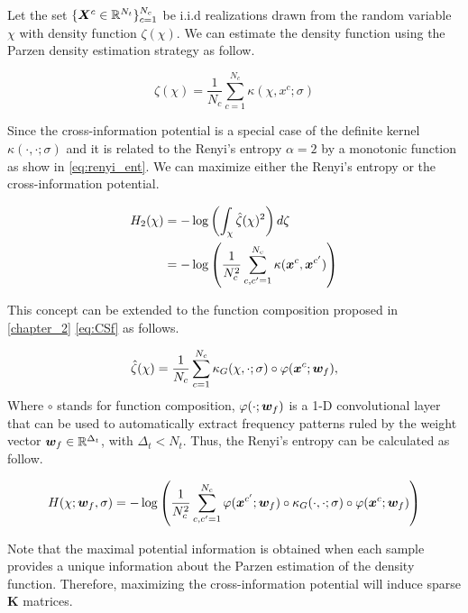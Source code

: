 Let the set $\{\bm {X}^c \in \mathbb{R}^{N_t} \}_{c=1}^{N_c}$ be i.i.d realizations drawn from the random variable $\chi$ with density function $\zeta(\chi)$. We can estimate the density function using the Parzen density estimation strategy as follow.

\begin{equation}
    \hat{\zeta}(\chi) = \frac{1}{N_c} \sum_{c=1}^{N_c} \kappa(\chi,x^c ; \sigma)
\end{equation}

Since the cross-information potential is a special case of the definite kernel $\kappa(\cdot,\cdot ; \sigma)$ and it is related to the Renyi's entropy $\alpha=2$ by a monotonic function as show in \cref{eq:renyi_ent}. We can maximize either the Renyi's entropy or the cross-information potential.

\begin{equation}\label{eq:renyi_ent}
\begin{aligned}
    H_2(\chi) &= - \log \left( \int_{\chi} \hat{\zeta}(\chi)^2 \right) d\zeta \\
              &= - \log \left( \frac{1}{N_{c}^{2}} \sum_{c,c'=1}^{N_c} \kappa ( \bm {x}^{c} , \bm {x}^{c'} ) \right)
\end{aligned}
\end{equation}

This concept can be extended to the function composition proposed in \cref{chapter_2} \cref{eq:CSf} as follows.

\begin{equation}
    \hat{\zeta}(\chi) = \frac{1}{N_c} \sum_{c=1}^{N_c}  {\kappa_G}(\chi,\cdot ; \sigma) \circ \varphi(\bm {x}^c; \bm {w}_f), 
\end{equation}
Where $\circ$ stands for function composition, $\varphi(\cdot; \bm {w}_f)$ is a 1-D convolutional layer that can be used to automatically extract frequency patterns ruled by the weight vector $\bm {w}_f\in \mathbb{R}^{\Delta_t}$, with $\Delta_t<N_t$. Thus, the Renyi's entropy can be calculated as follow.

\begin{equation}
    H(\chi; \bm {w}_f, \sigma) = - \log \left( \frac{1}{N_c^2} \sum_{c,c'=1}^{N_c} \varphi(\bm {x}^{c'}; \bm {w}_f) \circ {\kappa_G}(\cdot,\cdot ; \sigma) \circ \varphi(\bm {x}^c; \bm {w}_f)  \right)
\end{equation}

Note that the maximal potential information is obtained when each sample provides a unique information about the Parzen estimation of the density function. Therefore, maximizing the cross-information potential will induce sparse $\mathbf{K}$ matrices.

